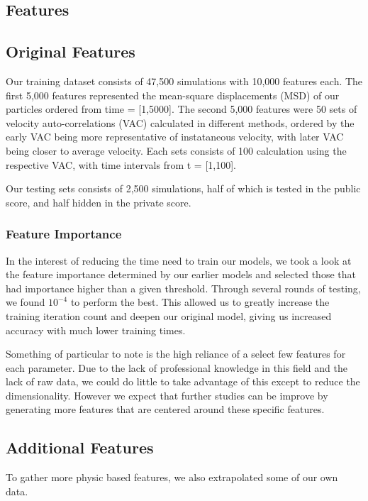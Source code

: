 \documentclass[a4paper, 12pt]{article}
\begin{document}
        \begin{multicols}{2}
        \section{Features}
        \subsection{Original Features}
        Our training dataset consists of 47,500 simulations with 10,000 features each. The first 5,000 features represented the mean-square displacements (MSD) of our particles ordered from time = [1,5000]. The second 5,000 features were 50 sets of velocity auto-correlations (VAC) calculated in different methods, ordered by the early VAC being more representative of instataneous velocity, with later VAC being closer to average velocity. Each sets consists of 100 calculation using the respective VAC, with time intervals from t = [1,100].
        
        Our testing sets consists of 2,500 simulations, half of which is tested in the public score, and half hidden in the private score.

            \subsubsection{Feature Importance}
                In the interest of reducing the time need to train our models, we took a look at the feature importance determined by our earlier models and selected those that had importance higher than a given threshold. Through several rounds of testing, we found $10^{-4}$ to perform the best. This allowed us to greatly increase the training iteration count and deepen our original model, giving us increased accuracy with much lower training times.
                
                Something of particular to note is the high reliance of a select few features for each parameter. Due to the lack of professional knowledge in this field and the lack of raw data, we could do little to take advantage of this except to reduce the dimensionality. However we expect that further studies can be improve by generating more features that are centered around these specific features.

            \subsection{Additional Features}
                To gather more physic based features, we also extrapolated some of our own data.


\end{multicols}
\end{document}

